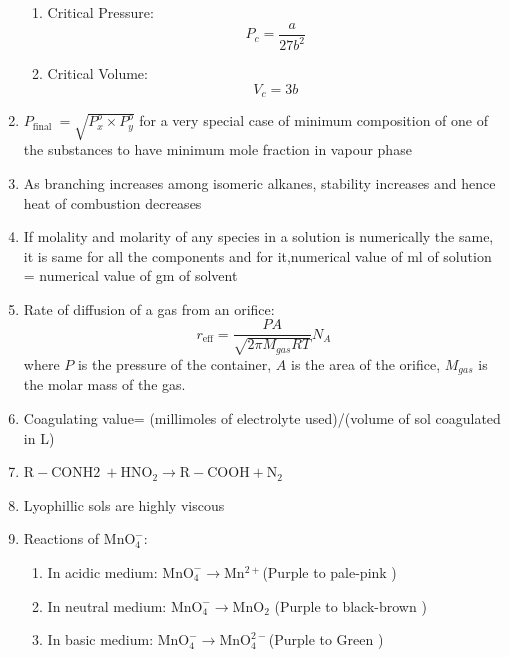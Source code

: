 \documentclass{article}
\numberwithin{equation}{section}
\numberwithin{figure}{section}
\begin{document}
\begin{enumerate}
\begin{enumerate}
			\item Critical Pressure:
				\begin{equation}
					P_{c}=\frac{a}{27b^2}
				\end{equation}
			\item Critical Volume:
				\begin{equation}
					V_{c}=3b
				\end{equation}
		\end{enumerate}
	\item $ P_{\text {final }}=\sqrt{P_{x}^{o} \times P_{y}^{o}}$ for a very special case of minimum composition of one of the substances to have minimum mole fraction in vapour phase
	\item As branching increases among isomeric alkanes, stability increases and hence heat of combustion decreases

	\item If molality and molarity of any species in a solution is numerically the same, it is same for all the components and for it,numerical value of ml of solution = numerical value of gm of solvent
	\item Rate of diffusion of a gas from an orifice:
		\begin{equation}
			r_{\text{eff}}=\frac{P A}{\sqrt{2\pi M_{gas}RT}}N_{A}
		\end{equation}
		where $P$ is the pressure of the container, $A$ is the area of the orifice, $M_{gas}$ is the molar mass of the gas. 
	\item Coagulating value= (millimoles of electrolyte used)/(volume of sol coagulated in L)  
	\item $\mathrm{R-CONH2\ + HNO_2\rightarrow R-COOH+N_2}$
	\item Lyophillic sols are highly viscous
	\item Reactions of $\mathrm{MnO_{4}^{-}}$:
		\begin{enumerate}
			\item In acidic medium: $\mathrm{MnO_{4}^{-} \rightarrow Mn^{2+}}$(Purple to pale-pink )
			\item In neutral medium: $\mathrm{MnO_{4}^{-} \rightarrow MnO_2}$ (Purple to black-brown )
			\item In basic medium: $\mathrm{MnO_{4}^{-} \rightarrow MnO_4^{2-}}$(Purple to Green )


\end{enumerate}
\end{enumerate}
\end{document}

